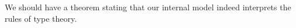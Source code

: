 \begin{comment}
\begingroup
\color{gray}
\subsubsection*{Old stuff below:}
\begin{enumerate}
\item a context morphism $\catid{\Gamma}:\ctxhom{\Gamma}{\Gamma}$ for every
context $\Gamma$.
\item a context morphism $f\circ g:\ctxhom{E}{\Gamma}$ for every two context
morphisms $f:\ctxhom{\Delta}{\Gamma}$ and $g:\ctxhom{E}{\Delta}$. 
\item paths $\id{f\circ\catid{\Delta}}{f}$ and $\id{\catid{\Gamma}\circ f}{f}$
for every $f:\ctxhom{\Delta}{\Gamma}$.
\item a path $\id{f\circ (g\circ h)}{(f\circ g)\circ h}$ for every
$f:\ctxhom{\Delta}{\Gamma}$, $g:\ctxhom{E}{\Delta}$ and $h:\ctxhom{Z}{E}$. 
\item a context morphism $\Gamma_!:\ctxhom{\Gamma}{\unit^\mfM}$ 
for every context $\Gamma$.
\item a path $\id{(\unit^\mfM)_!}{\catid{\unit^\mfM}}$.
\item a path $\id{\Gamma_!\circ f}{\Delta_!}$ for every $f:\ctxhom{\Delta}{\Gamma}$. 
\item a path $\id{A[\catid{\Gamma}]}{A}$ for every object $A$ in context $\Gamma$.
\item a path $\id{A[f][g]}{A[f\circ g]}$ for every object $A$ in context $\Gamma$
and every $f:\ctxhom{\Delta}{\Gamma}$ and $g:\ctxhom{E}{\Delta}$. 
\end{enumerate}
\endgroup
\end{comment}

\begin{desiderata}
We should have a theorem stating that our internal model indeed interprets
the rules of type theory.
\end{desiderata}

